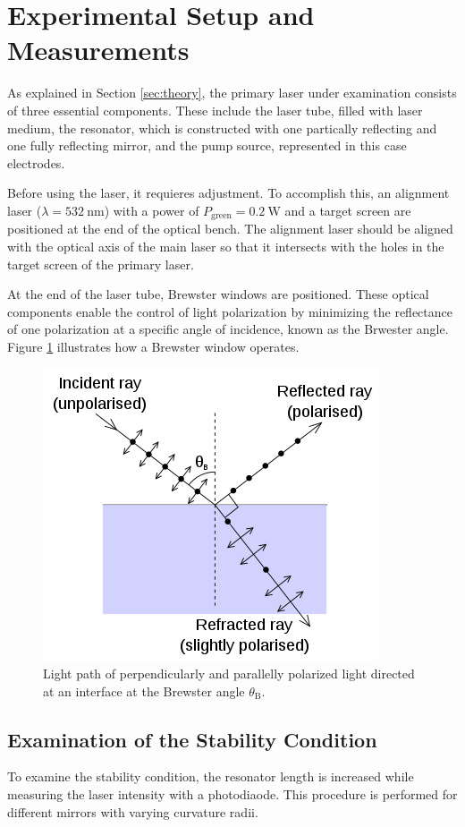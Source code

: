 \section{Experimental Setup and Measurements}

As explained in Section \ref{sec:theory}, the primary laser 
under examination consists of three essential components. These 
include the laser tube, filled with laser medium, the resonator, 
which is constructed with one partically reflecting and one 
fully reflecting mirror, and the pump source, represented in this 
case electrodes. 

Before using the laser, it requieres adjustment. To accomplish this, 
an alignment laser ($\lambda=\SI{532}{\nano\meter}$) with a power 
of $P_\text{green}=\SI{0.2}{\watt}$ and a target screen are positioned
at the end of the optical bench. The alignment laser should be aligned 
with the optical axis of the main laser so that it intersects with 
the holes in the target screen of the primary laser.  

At the end of the laser tube, Brewster windows are positioned. 
These optical components enable the control of light polarization
by minimizing the reflectance of one polarization at a specific
angle of incidence, known as the Brwester angle. Figure \ref{fig:brewster} 
illustrates how a Brewster window operates.

\begin{figure}
    \centering
    \includegraphics[width=0.5\linewidth]{pictures/Brewster.png} %
    \caption{Light path of perpendicularly and parallelly polarized light directed at an interface at the Brewster angle $\theta_\text{B}$.}
    \label{fig:brewster}
\end{figure}

\subsection{Examination of the Stability Condition}
To examine the stability condition, the resonator length is increased
while measuring the laser intensity with a photodiaode. This 
procedure is performed for different mirrors with varying curvature 
radii.

